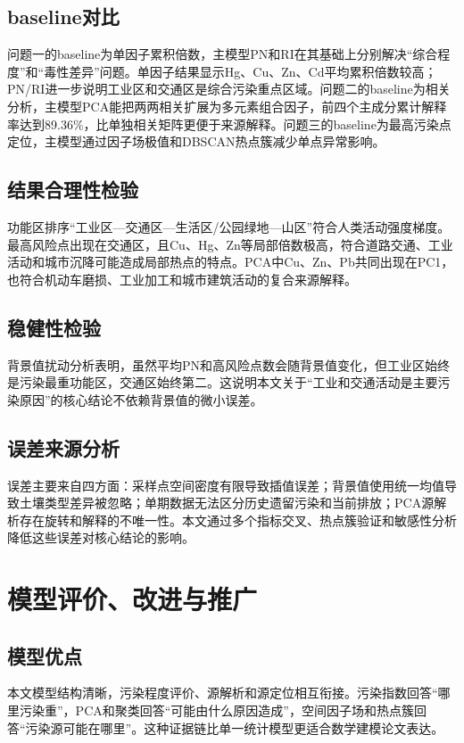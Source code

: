 \documentclass[UTF8,a4paper,12pt]{ctexart}
\begin{document}
\subsection{baseline对比}
问题一的baseline为单因子累积倍数，主模型PN和RI在其基础上分别解决“综合程度”和“毒性差异”问题。单因子结果显示Hg、Cu、Zn、Cd平均累积倍数较高；PN/RI进一步说明工业区和交通区是综合污染重点区域。问题二的baseline为相关分析，主模型PCA能把两两相关扩展为多元素组合因子，前四个主成分累计解释率达到89.36\%，比单独相关矩阵更便于来源解释。问题三的baseline为最高污染点定位，主模型通过因子场极值和DBSCAN热点簇减少单点异常影响。

\subsection{结果合理性检验}
功能区排序“工业区—交通区—生活区/公园绿地—山区”符合人类活动强度梯度。最高风险点出现在交通区，且Cu、Hg、Zn等局部倍数极高，符合道路交通、工业活动和城市沉降可能造成局部热点的特点。PCA中Cu、Zn、Pb共同出现在PC1，也符合机动车磨损、工业加工和城市建筑活动的复合来源解释。

\subsection{稳健性检验}
背景值扰动分析表明，虽然平均PN和高风险点数会随背景值变化，但工业区始终是污染最重功能区，交通区始终第二。这说明本文关于“工业和交通活动是主要污染原因”的核心结论不依赖背景值的微小误差。

\subsection{误差来源分析}
误差主要来自四方面：采样点空间密度有限导致插值误差；背景值使用统一均值导致土壤类型差异被忽略；单期数据无法区分历史遗留污染和当前排放；PCA源解析存在旋转和解释的不唯一性。本文通过多个指标交叉、热点簇验证和敏感性分析降低这些误差对核心结论的影响。

\section{模型评价、改进与推广}
\subsection{模型优点}
本文模型结构清晰，污染程度评价、源解析和源定位相互衔接。污染指数回答“哪里污染重”，PCA和聚类回答“可能由什么原因造成”，空间因子场和热点簇回答“污染源可能在哪里”。这种证据链比单一统计模型更适合数学建模论文表达。
\end{document}
